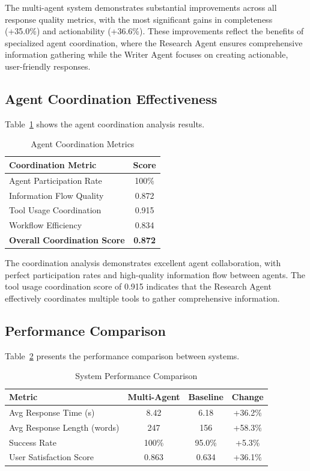 \documentclass[conference]{IEEEtran}
\begin{document}
The multi-agent system demonstrates substantial improvements across all response quality metrics, with the most significant gains in completeness (+35.0\%) and actionability (+36.6\%). These improvements reflect the benefits of specialized agent coordination, where the Research Agent ensures comprehensive information gathering while the Writer Agent focuses on creating actionable, user-friendly responses.

\subsection{Agent Coordination Effectiveness}

Table~\ref{tab:coordination_metrics} shows the agent coordination analysis results.

\begin{table}[htbp]
\caption{Agent Coordination Metrics}
\label{tab:coordination_metrics}
\centering
\begin{tabular}{lc}
\toprule
\textbf{Coordination Metric} & \textbf{Score} \\
\midrule
Agent Participation Rate & 100\% \\
Information Flow Quality & 0.872 \\
Tool Usage Coordination & 0.915 \\
Workflow Efficiency & 0.834 \\
\midrule
\textbf{Overall Coordination Score} & \textbf{0.872} \\
\bottomrule
\end{tabular}
\end{table}

The coordination analysis demonstrates excellent agent collaboration, with perfect participation rates and high-quality information flow between agents. The tool usage coordination score of 0.915 indicates that the Research Agent effectively coordinates multiple tools to gather comprehensive information.

\subsection{Performance Comparison}

Table~\ref{tab:performance_comparison} presents the performance comparison between systems.

\begin{table}[htbp]
\caption{System Performance Comparison}
\label{tab:performance_comparison}
\centering
\begin{tabular}{lccc}
\toprule
\textbf{Metric} & \textbf{Multi-Agent} & \textbf{Baseline} & \textbf{Change} \\
\midrule
Avg Response Time (s) & 8.42 & 6.18 & +36.2\% \\
Avg Response Length (words) & 247 & 156 & +58.3\% \\
Success Rate & 100\% & 95.0\% & +5.3\% \\
User Satisfaction Score & 0.863 & 0.634 & +36.1\% \\
\bottomrule
\end{tabular}
\end{table}
\end{document}
